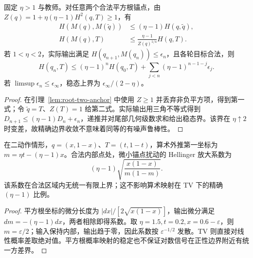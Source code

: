 \begin{proposition}
\label{prop:root-extrapolation-perturbation}
固定 $\eta>1$ 与教师。对任意两个合法平方根锚点，由 $Z(q)=1+\eta(\eta-1)H^2(q,T)\ge1$，有
\begin{align}
H(M(q),M(\widetilde q))&\le(\eta-1)H(q,\widetilde q),\\
H(M(q),T)&\le\frac{\eta-1}{Z(q)^{1/4}}H(q,T).
\end{align}
若 $1<\eta<2$，实际输出满足 $H(q_{n+1},M(q_n))\le\epsilon_n$，且各轮目标合法，则
\begin{equation}
H(q_n,T)\le(\eta-1)^nH(q_0,T)
+\sum_{j<n}(\eta-1)^{n-1-j}\epsilon_j.
\end{equation}
若 $\limsup\epsilon_n\le\epsilon_\infty$，稳态上界为 $\epsilon_\infty/(2-\eta)$。
\end{proposition}
\begin{proof}
在引理~\ref{lem:root-two-anchor} 中使用 $Z\ge1$ 并丢弃非负平方项，得到第一式；令 $\widetilde q=T$、$Z(T)=1$ 给第二式。实际输出用三角不等式得到 $D_{n+1}\le(\eta-1)D_n+\epsilon_n$，递推并对尾部几何级数求和给出稳态界。该界在 $\eta\uparrow2$ 时变差，故精确边界收敛不意味着同等的有噪声鲁棒性。
\end{proof}

\begin{proposition}
\label{prop:arithmetic-hellinger-instability}
在二动作情形，$q=(x,1-x)$、$T=(t,1-t)$，算术外推第一坐标为 $m=\eta t-(\eta-1)x$。合法内部点处，微小锚点扰动的 Hellinger 放大系数为
\begin{equation}
(\eta-1)\sqrt{\frac{x(1-x)}{m(1-m)}}.
\end{equation}
该系数在合法区域内无统一有限上界；这不影响算术映射在 TV 下的精确 $(\eta-1)$ 比例。
\end{proposition}
\begin{proof}
平方根坐标的微分长度为 $|dx|/[2\sqrt{x(1-x)}]$，输出微分满足 $dm=-(\eta-1)dx$，两者相除即得系数。取 $\eta=1.5,t=0.2,x=0.6-\varepsilon$，则 $m=\varepsilon/2$；输入保持内部，输出趋于零，因此系数按 $\varepsilon^{-1/2}$ 发散。TV 则直接对线性概率差取绝对值。平方根概率映射的稳定也不保证对数信号在正性边界附近有统一方差界。
\end{proof}

